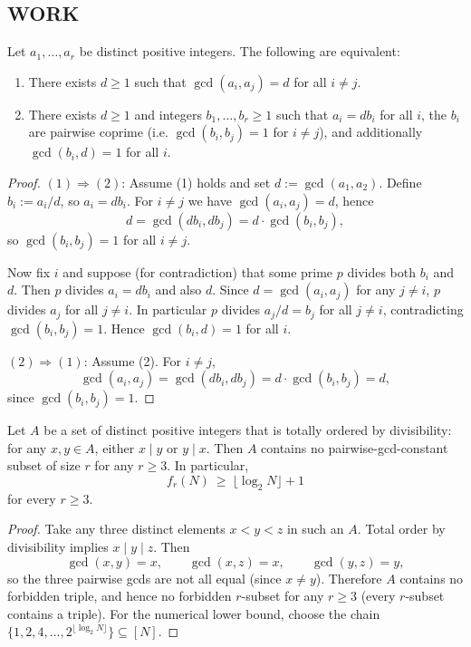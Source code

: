 \subsection*{WORK}
\begin{lemma}\label{lem:535-char}
Let $a_1,\dots,a_r$ be distinct positive integers. The following are equivalent:
\begin{enumerate}
\item There exists $d\ge 1$ such that $\gcd(a_i,a_j)=d$ for all $i\ne j$.
\item There exists $d\ge 1$ and integers $b_1,\dots,b_r\ge 1$ such that $a_i=db_i$ for all $i$, the $b_i$ are pairwise coprime (i.e. $\gcd(b_i,b_j)=1$ for $i\ne j$), and additionally $\gcd(b_i,d)=1$ for all $i$.
\end{enumerate}
\end{lemma}
\begin{proof}
$(1)\Rightarrow(2)$: Assume (1) holds and set $d:=\gcd(a_1,a_2)$. Define $b_i:=a_i/d$, so $a_i=db_i$.
For $i\ne j$ we have $\gcd(a_i,a_j)=d$, hence
\[
d=\gcd(db_i,db_j)=d\cdot \gcd(b_i,b_j),
\]
so $\gcd(b_i,b_j)=1$ for all $i\ne j$.

Now fix $i$ and suppose (for contradiction) that some prime $p$ divides both $b_i$ and $d$. Then $p$ divides $a_i=db_i$ and also $d$. Since $d=\gcd(a_i,a_j)$ for any $j\ne i$, $p$ divides $a_j$ for all $j\ne i$. In particular $p$ divides $a_j/d=b_j$ for all $j\ne i$, contradicting $\gcd(b_i,b_j)=1$. Hence $\gcd(b_i,d)=1$ for all $i$.

$(2)\Rightarrow(1)$: Assume (2). For $i\ne j$,
\[
\gcd(a_i,a_j)=\gcd(db_i,db_j)=d\cdot \gcd(b_i,b_j)=d,
\]
since $\gcd(b_i,b_j)=1$.
\end{proof}

\begin{lemma}\label{lem:535-chain}
Let $A$ be a set of distinct positive integers that is totally ordered by divisibility: for any $x,y\in A$, either $x\mid y$ or $y\mid x$. Then $A$ contains no pairwise-gcd-constant subset of size $r$ for any $r\ge 3$. In particular,
\[
f_r(N)\ \ge\ \big\lfloor \log_2 N\big\rfloor+1
\]
for every $r\ge 3$.
\end{lemma}
\begin{proof}
Take any three distinct elements $x<y<z$ in such an $A$. Total order by divisibility implies $x\mid y\mid z$. Then
\[
\gcd(x,y)=x,\qquad \gcd(x,z)=x,\qquad \gcd(y,z)=y,
\]
so the three pairwise gcds are not all equal (since $x\ne y$). Therefore $A$ contains no forbidden triple, and hence no forbidden $r$-subset for any $r\ge 3$ (every $r$-subset contains a triple). For the numerical lower bound, choose the chain $\{1,2,4,\dots,2^{\lfloor \log_2 N\rfloor}\}\subseteq [N]$.
\end{proof}

